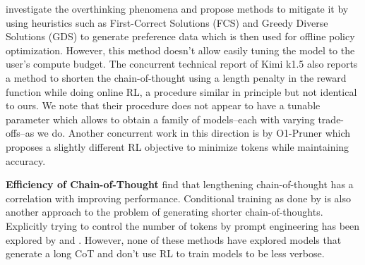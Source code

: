 \citet{chen2024think23overthinkingo1like} investigate the overthinking phenomena and propose methods to mitigate it by using heuristics such as First-Correct Solutions (FCS) and Greedy Diverse Solutions (GDS) to generate preference data which is then used for offline policy optimization. However, this method doesn't allow easily tuning the model to the user's compute budget. 
The concurrent technical report of Kimi k1.5 \cite{kimiteam2025kimik15scalingreinforcement} also reports a method to shorten the chain-of-thought using a length penalty in the reward function while doing online RL, a procedure similar in principle but not identical to ours.
We note that their procedure does not appear to have a tunable parameter which allows to obtain a family of models--each with varying trade-offs--as we do. Another concurrent work in this direction is by O1-Pruner \cite{luo2025o1prunerlengthharmonizingfinetuningo1like} which proposes a slightly different RL objective to minimize tokens while maintaining accuracy. 

\textbf{Efficiency of Chain-of-Thought} \citet{jin-etal-2024-impact} find that lengthening chain-of-thought has a correlation with improving performance. Conditional training as done by \citet{kang2024c3otgeneratingshorterchainofthought} is also another approach to the problem of generating shorter chain-of-thoughts. Explicitly trying to control the number of tokens by prompt engineering has been explored by \citet{nayab2025concisethoughtsimpactoutput} and \citet{han2024tokenbudgetawarellmreasoning}. However, none of these methods have explored models that generate a long CoT and don't use RL to train models to be less verbose.